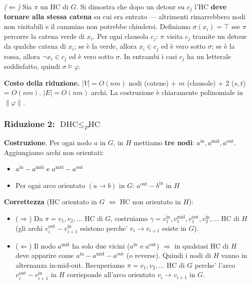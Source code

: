 \emph{($\Leftarrow$)} Sia $\pi$ un HC di $G$. Si dimostra che dopo un detour su $c_j$ l'HC \textbf{deve tornare alla stessa catena} su cui era entrato — altrimenti rimarrebbero nodi non visitabili e il cammino non potrebbe chiudersi. Definiamo $\sigma(x_i) = \top$ sse $\pi$ percorre la catena verde di $x_i$. Per ogni clausola $c_j$: $\pi$ visita $c_j$ tramite un detour da qualche catena di $x_i$; se è la verde, allora $x_i \in c_j$ ed è vero sotto $\sigma$; se è la rossa, allora $\neg x_i \in c_j$ ed è vero sotto $\sigma$. In entrambi i casi $c_j$ ha un letterale soddisfatto, quindi $\sigma \models \varphi$.

\textbf{Costo della riduzione.} $|V| = O(nm)$ nodi (catene) + $m$ (clausole) + 2 ($s, t$) = $O(nm)$. $|E| = O(nm)$ archi. La costruzione è chiaramente polinomiale in $\|\varphi\|$.

\subsubsection{Riduzione 2: $\text{DHC} \leq_P \text{HC}$}

\textbf{Costruzione}. Per ogni nodo $a$ in $G$, in $H$ mettiamo \textbf{tre nodi}: $a^{\text{in}}, a^{\text{mid}}, a^{\text{out}}$. Aggiungiamo archi non orientati:
\begin{itemize}
  \item $a^{\text{in}} - a^{\text{mid}}$ e $a^{\text{mid}} - a^{\text{out}}$
  \item Per ogni arco orientato $(a \to b)$ in $G$: $a^{\text{out}} - b^{\text{in}}$ in $H$
\end{itemize}

\textbf{Correttezza} (HC orientato in $G$ $\iff$ HC non orientato in $H$):
\begin{itemize}
  \item ($\Rightarrow$) Da $\pi = v_1, v_2, \ldots$ HC di $G$, costruiamo $\gamma = v_1^{\text{in}}, v_1^{\text{mid}}, v_1^{\text{out}}, v_2^{\text{in}}, \ldots$ HC di $H$ (gli archi $v_i^{\text{out}} - v_{i+1}^{\text{in}}$ esistono perche' $v_i \to v_{i+1}$ esiste in $G$).
  \item ($\Leftarrow$) Il nodo $a^{\text{mid}}$ ha solo due vicini ($a^{\text{in}}$ e $a^{\text{out}}$) $\Rightarrow$ in qualsiasi HC di $H$ deve apparire come $a^{\text{in}} - a^{\text{mid}} - a^{\text{out}}$ (o reverse). Quindi i nodi di $H$ vanno in alternanza in-mid-out. Recuperiamo $\pi = v_1, v_2, \ldots$ HC di $G$ perche' l'arco $v_i^{\text{out}} - v_{i+1}^{\text{in}}$ in $H$ corrisponde all'arco orientato $v_i \to v_{i+1}$ in $G$.
\end{itemize}

